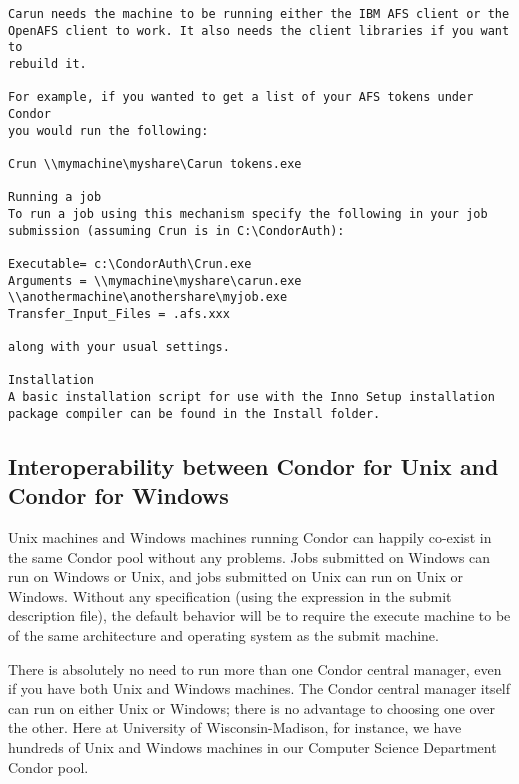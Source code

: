 \begin{verbatim}
Carun needs the machine to be running either the IBM AFS client or the 
OpenAFS client to work. It also needs the client libraries if you want to 
rebuild it.

For example, if you wanted to get a list of your AFS tokens under Condor 
you would run the following:

Crun \\mymachine\myshare\Carun tokens.exe

Running a job
To run a job using this mechanism specify the following in your job 
submission (assuming Crun is in C:\CondorAuth):

Executable= c:\CondorAuth\Crun.exe
Arguments = \\mymachine\myshare\carun.exe 
\\anothermachine\anothershare\myjob.exe
Transfer_Input_Files = .afs.xxx

along with your usual settings.

Installation
A basic installation script for use with the Inno Setup installation 
package compiler can be found in the Install folder.
\end{verbatim}




\subsection{Interoperability between Condor for Unix and Condor for Windows}

Unix machines and Windows machines running Condor can happily
co-exist in the same Condor pool without any problems.
Jobs submitted on Windows can run on Windows or Unix,
and jobs submitted on Unix can run on Unix or Windows.
Without any specification
(using the  expression in the submit description file),
the default behavior will be to 
require the execute machine to be of the same architecture and operating
system as the submit machine.

There is absolutely no need to run more than one Condor central manager,
even if you have both Unix and Windows machines.  The Condor central manager
itself can run on either Unix or Windows; there is no advantage to choosing
one over the other.  Here at University of Wisconsin-Madison, for
instance, we have hundreds of Unix and
Windows machines in our Computer Science Department Condor pool.

